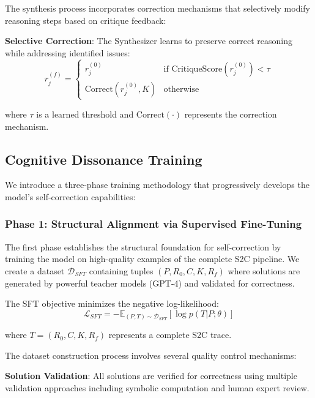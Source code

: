 \documentclass[10pt,twocolumn]{article}
\newcommand{\ssc}{\textsc{S2C}}
\begin{document}
The synthesis process incorporates correction mechanisms that selectively modify reasoning steps based on critique feedback:

\textbf{Selective Correction}: The Synthesizer learns to preserve correct reasoning while addressing identified issues:
\begin{equation}
r_j^{(f)} = \begin{cases}
r_j^{(0)} & \text{if } \text{CritiqueScore}(r_j^{(0)}) < \tau \\
\text{Correct}(r_j^{(0)}, K) & \text{otherwise}
\end{cases}
\end{equation}

where $\tau$ is a learned threshold and $\text{Correct}(\cdot)$ represents the correction mechanism.

\subsection{Cognitive Dissonance Training}

We introduce a three-phase training methodology that progressively develops the model's self-correction capabilities:

\subsubsection{Phase 1: Structural Alignment via Supervised Fine-Tuning}

The first phase establishes the structural foundation for self-correction by training the model on high-quality examples of the complete \ssc{} pipeline. We create a dataset $\mathcal{D}_{SFT}$ containing tuples $(P, R_0, C, K, R_f)$ where solutions are generated by powerful teacher models (GPT-4) and validated for correctness.

The SFT objective minimizes the negative log-likelihood:
\begin{equation}
\mathcal{L}_{SFT} = -\mathbb{E}_{(P,T) \sim \mathcal{D}_{SFT}} \left[ \log p(T | P; \theta) \right]
\end{equation}

where $T = (R_0, C, K, R_f)$ represents a complete \ssc{} trace.

The dataset construction process involves several quality control mechanisms:

\textbf{Solution Validation}: All solutions are verified for correctness using multiple validation approaches including symbolic computation and human expert review.
\end{document}
